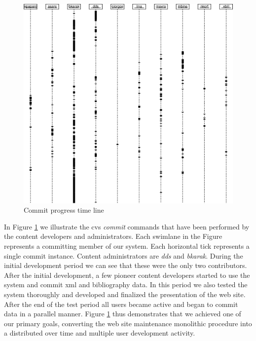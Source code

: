 \documentclass{article}
\begin{document}
\begin{figure}[h!]
\includegraphics[scale=0.6]{cvs-log.eps}
\caption{Commit progress time line}
\label{fig:cvs-log}
\end{figure}

In Figure \ref{fig:cvs-log} we illustrate the {\sc cvs} \textit{commit} commands that have been performed by
the content developers and administrators. Each swimlane in the Figure represents a committing
member of our system. Each horizontal tick represents a single commit instance.
Content administrators are \textit{dds} and \textit{bkarak}. 
During the initial development period we can see that these were the
only two contributors.
After the initial development, a few 
pioneer content developers started to use the system and commit {\sc xml} and bibliography data. In this period 
we also tested the system thoroughly and developed and finalized the presentation of the web site. After the end of
the test period all users became active and began to commit data in a parallel manner. Figure \ref{fig:cvs-log} 
thus demonstrates that we achieved one of our primary goals, converting the web site maintenance monolithic procedure 
into a distributed over time and multiple user development activity.
\end{document}
